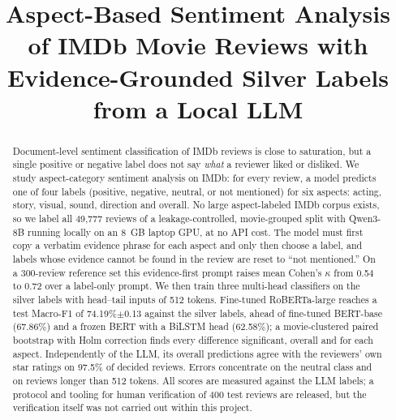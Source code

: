 \documentclass[conference]{IEEEtran}
\begin{document}
\title{Aspect-Based Sentiment Analysis of IMDb Movie Reviews with Evidence-Grounded Silver Labels from a Local LLM}

\author{
\and
{}
\and
{}
}

\maketitle

\begin{abstract}
Document-level sentiment classification of IMDb reviews is close to saturation, but a single positive or negative label does not say \emph{what} a reviewer liked or disliked. We study aspect-category sentiment analysis on IMDb: for every review, a model predicts one of four labels (positive, negative, neutral, or not mentioned) for six aspects: acting, story, visual, sound, direction and overall. No large aspect-labeled IMDb corpus exists, so we label all 49{,}777 reviews of a leakage-controlled, movie-grouped split with Qwen3-8B running locally on an 8~GB laptop GPU, at no API cost. The model must first copy a verbatim evidence phrase for each aspect and only then choose a label, and labels whose evidence cannot be found in the review are reset to ``not mentioned.'' On a 300-review reference set this evidence-first prompt raises mean Cohen's $\kappa$ from 0.54 to 0.72 over a label-only prompt. We then train three multi-head classifiers on the silver labels with head--tail inputs of 512 tokens. Fine-tuned RoBERTa-large reaches a test Macro-F1 of 74.19\%$\pm$0.13 against the silver labels, ahead of fine-tuned BERT-base (67.86\%) and a frozen BERT with a BiLSTM head (62.58\%); a movie-clustered paired bootstrap with Holm correction finds every difference significant, overall and for each aspect. Independently of the LLM, its overall predictions agree with the reviewers' own star ratings on 97.5\% of decided reviews. Errors concentrate on the neutral class and on reviews longer than 512 tokens. All scores are measured against the LLM labels; a protocol and tooling for human verification of 400 test reviews are released, but the verification itself was not carried out within this project.
\end{abstract}
\end{document}
